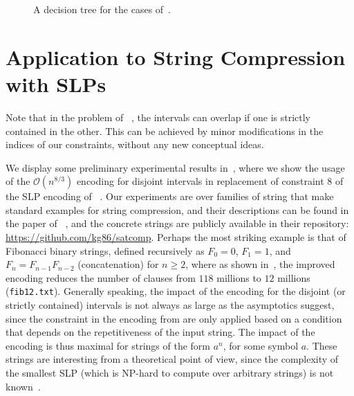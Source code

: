 \documentclass[11pt]{article}
\renewcommand{\O}{\mathcal{O}}
\begin{document}
\begin{figure}
\begin{tikzpicture}

\end{tikzpicture}
\caption{A decision tree for the cases of~. }\label{fig:decision-tree}
\end{figure}

\section{Application to String Compression with SLPs}\label{app:disjoint-intervals}


Note that in the problem of ~\citet{bannai_et_al:LIPIcs.ESA.2022.12}, the intervals can overlap if one is strictly contained in the other. This can be achieved by minor modifications in the indices of our constraints, without any new conceptual ideas.


We display some preliminary experimental results in~, where we show the usage of the $\O(n^{8/3})$ encoding for disjoint intervals in replacement of constraint 8 of the SLP encoding of ~\citet{bannai_et_al:LIPIcs.ESA.2022.12}. Our experiments are over families of string that make standard examples for string compression, and their descriptions can be found in the paper of ~\citet{bannai_et_al:LIPIcs.ESA.2022.12}, and the concrete strings are publicly available in their repository: \url{https://github.com/kg86/satcomp}.
Perhaps the most striking example is that of Fibonacci binary strings, defined recursively as $F_0 = 0$, $F_1 = 1$, and $F_n = F_{n-1} F_{n-2}$ (concatenation) for $n \geq 2$, where as shown in~, the improved encoding reduces the number of clauses from $118$ millions to $12$ millions (\texttt{fib12.txt}).
Generally speaking, the impact of the encoding for the disjoint (or strictly contained) intervals is not always as large as the asymptotics suggest, since the constraint in the encoding from \cite[Equation (8)]{bannai_et_al:LIPIcs.ESA.2022.12} are only applied based on a condition that depends on the repetitiveness of the input string. The impact of the encoding is thus maximal for strings of the form $a^n$, for some symbol $a$. These strings are interesting from a theoretical point of view, since the complexity of the smallest SLP (which is NP-hard to compute over arbitrary strings) is not known~\cite{171713}.
\end{document}
